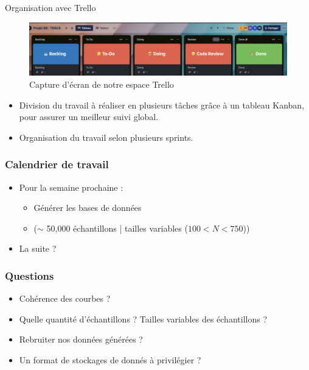 \documentclass{beamer}
\begin{document}
\begin{frame}{Organisation avec Trello}

  \begin{figure}
      \centering
      \includegraphics[width=1\linewidth]{images/trello}
      \caption{Capture d'écran de notre espace Trello}
      \label{fig:trello}
  \end{figure}
  
  \begin{itemize}
      \item Division du travail à réaliser en plusieurs tâches grâce à un tableau Kanban, pour assurer un meilleur suivi global.
      \item Organisation du travail selon plusieurs sprints.
  \end{itemize}
  
\end{frame}

\begin{frame}
  \frametitle{Calendrier de travail}
    \begin{itemize}
        \item Pour la semaine prochaine : 
        \begin{itemize}
            \item[\hspace{1cm}] Générer les bases de données 
            \item[\hspace{2cm}] ($\sim$ 50,000 échantillons | tailles variables ($100 < N < 750$))
        \end{itemize}
        \item La suite ?
    \end{itemize}
\end{frame}

\begin{frame}
  \frametitle{Questions}
  \begin{itemize}
    \item Cohérence des courbes ?
    \item Quelle quantité d'échantillons ? Tailles variables des échantillons ?
    \item Rebruiter nos données générées ? 
    \item Un format de stockages de donnés à privilégier ?
  \end{itemize}
\end{frame}

\end{document}
